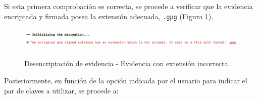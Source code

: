 \documentclass[12pt,a4paper, twoside]{report}
\begin{document}
	Si esta primera comprobación es correcta, se procede a verificar que la evidencia encriptada y firmada posea la extensión adecuada, \texttt{.gpg} (Figura \ref{fig:userguide_evidence_invalidFormat}). 

		\begin{figure}[!ht]   
			\caption{Desencriptación de evidencia - Evidencia con extensión incorrecta.} 
			\begin{center} 					\includegraphics[width=16cm,height=1.1cm]{Images/userGuide/evidence/evidence_invalidFormat} \\
				\label{fig:userguide_evidence_invalidFormat} 
			\end{center}  
		\end{figure}
	
	Posteriormente, en función de la opción indicada por el usuario para indicar el par de claves a utilizar, se procede a:
\end{document}
